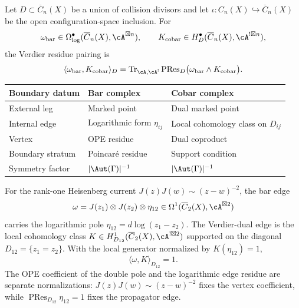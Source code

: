 \begin{definition}
\label{def:physical-pairing}
Let \(D\subset \overline{C}_n(X)\) be a union of collision divisors and
let \(\iota\colon C_n(X)\hookrightarrow \overline{C}_n(X)\) be the open
configuration-space inclusion.  For
\[
\omega_{\mathrm{bar}}\in
\Omega^\bullet_{\log}(\overline{C}_n(X),\cA^{\boxtimes n}),
\qquad
K_{\mathrm{cobar}}\in
H^\bullet_D(\overline{C}_n(X),\cA^{!\boxtimes n}),
\]
the Verdier residue pairing is
\[
\langle \omega_{\mathrm{bar}},K_{\mathrm{cobar}}\rangle_D
=\operatorname{Tr}_{\cA,\cA^!}
\operatorname{PRes}_{D}
\bigl(\omega_{\mathrm{bar}}\wedge K_{\mathrm{cobar}}\bigr).
\]

\begin{center}
\begin{tabular}{lll}
\toprule
\textbf{Boundary datum} & \textbf{Bar complex} & \textbf{Cobar complex} \\
\midrule
External leg & Marked point & Dual marked point \\
Internal edge & Logarithmic form $\eta_{ij}$ & Local cohomology class on $D_{ij}$ \\
Vertex & OPE residue & Dual coproduct \\
Boundary stratum & Poincar\'e residue & Support condition \\
Symmetry factor & $|\Aut(\Gamma)|^{-1}$ & $|\Aut(\Gamma)|^{-1}$ \\
\bottomrule
\end{tabular}
\end{center}
\end{definition}

\begin{example}
For the rank-one Heisenberg current \(J(z)J(w)\sim (z-w)^{-2}\), the
bar edge
\[
\omega = J(z_1) \otimes J(z_2) \otimes \eta_{12}
\in \Omega^1(\overline{C}_2(X), \cA^{\boxtimes 2})
\]
carries the logarithmic pole \(\eta_{12}=d\log(z_1-z_2)\).  The
Verdier-dual edge is the local cohomology class
$K \in H^1_{D_{12}}(\overline{C}_2(X), \cA^{!\boxtimes 2})$
supported on the diagonal \(D_{12}=\{z_1=z_2\}\).  With the local
generator normalized by \(K(\eta_{12})=1\),
\[
\langle \omega,K\rangle_{D_{12}}=1.
\]
The OPE coefficient of the double pole and the logarithmic edge
residue are separate normalizations: \(J(z)J(w)\sim (z-w)^{-2}\)
fixes the vertex coefficient, while
\(\operatorname{PRes}_{D_{12}}\eta_{12}=1\) fixes the propagator edge.
\end{example}

